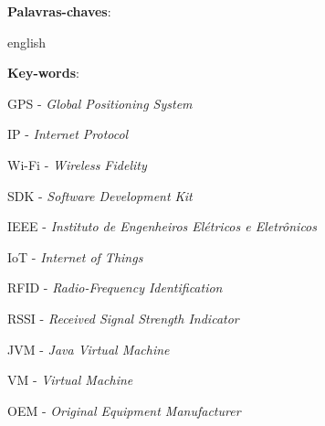 
\setlength{\absparsep}{18pt} %
\begin{resumo}


    \textbf{Palavras-chaves}:

\end{resumo}

\begin{resumo}[Abstract]
    \begin{otherlanguage*}{english}

        \vspace{\onelineskip}

        \noindent
        \textbf{Key-words}:
    \end{otherlanguage*}
\end{resumo}


\listoffigures*


\begin{siglas}

    \item GPS - \textit{Global Positioning System}
    \item IP - \textit{Internet Protocol}
    \item Wi-Fi - \textit{Wireless Fidelity}
    \item SDK - \textit{Software Development Kit}
    \item IEEE - \textit{Instituto de Engenheiros Elétricos e Eletrônicos}
    \item IoT - \textit{Internet of Things}
    \item RFID - \textit{Radio-Frequency Identification}
    \item RSSI - \textit{Received Signal Strength Indicator}
    \item JVM - \textit{Java Virtual Machine}
    \item VM - \textit{Virtual Machine}
    \item OEM - \textit{Original Equipment Manufacturer}

\end{siglas}


\tableofcontents*
\cleardoublepage

